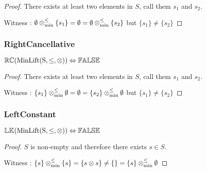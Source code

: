 \documentclass[../Summary.tex]{subfiles}
\begin{document}
\begin{proof}

\vspace{0.5em}

There exists at least two elements in $S$, call them $s_1$ and $s_2$.

\vspace{0.5em}

Witness : $\emptyset \mathbin{\otimes_{\min}^{\leq}} \{s_1\} = \emptyset = \emptyset \mathbin{\otimes_{\min}^{\leq}} \{s_2\} $ but $\{s_1\} \neq \{s_2\}$
\end{proof}




\subsubsection{RightCancellative}

\begin{theorem} \label{thm:minlift_rc}
${\mathbb{RC}}(\mathrm{MinLift(S,\leq,\otimes)}) \Leftrightarrow {\mathbb{FALSE}}$
\end{theorem}

\begin{proof}

\vspace{0.5em}

There exists at least two elements in $S$, call them $s_1$ and $s_2$.

\vspace{0.5em}

Witness : $\{s_1\} \mathbin{\otimes_{\min}^{\leq}} \emptyset = \emptyset = \{s_2\} \mathbin{\otimes_{\min}^{\leq}} \emptyset$ but $\{s_1\} \neq \{s_2\}$
\end{proof}




\subsubsection{LeftConstant}

\begin{theorem} \label{thm:minlift_lk}
${\mathbb{LK}}(\mathrm{MinLift(S,\leq,\otimes)}) \Leftrightarrow {\mathbb{FALSE}}$
\end{theorem}

\begin{proof}

\vspace{0.5em}

$S$ is non-empty and therefore there exists $s \in S$.

\vspace{0.5em}

Witness : $\{s\} \mathbin{\otimes_{\min}^{\leq}} \{s\} = \{s \otimes s\} \neq \{\} = \{s\} \mathbin{\otimes_{\min}^{\leq}} \emptyset$
\end{proof}
\end{document}
